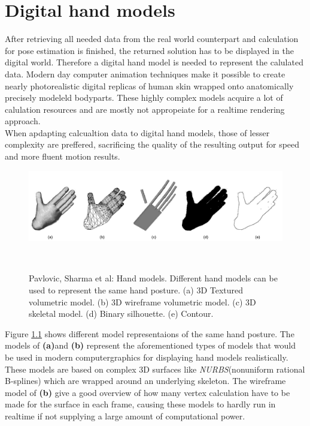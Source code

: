 \chapter{Digital hand models}
After retrieving all needed data from the real world counterpart and calculation for pose estimation is finished, the returned solution has to be displayed in the digital world. Therefore a digital hand model is needed to represent the calulated data. Modern day computer animation techniques make it possible to create nearly photorealistic digital replicas of human skin wrapped onto anatomically precisely modeleld bodyparts. These highly complex models acquire a lot of calulation resources and are mostly not appropeiate for a realtime rendering approach.\\
When apdapting calcualtion data to digital hand models, those of lesser complexity are preffered, sacrificing the quality of the resulting output for speed and more fluent motion results.
\begin{figure}[H]
\includegraphics[width=\textwidth]{images/Pavlovic-Sharmaetal.jpg}
\caption{Pavlovic, Sharma et al: Hand models. Different hand models can be used to represent the same hand posture. (a) 3D Textured volumetric model. (b) 3D wireframe volumetric model. (c) 3D skeletal model. (d) Binary silhouette. (e) Contour.}
~\cite[p.~682]{Pavlovic.1997}
\label{handmodels_detail_level}
\end{figure}
Figure \ref{handmodels_detail_level} shows different model representaions of the same hand posture. The models of \textbf{(a)}and \textbf{(b)} represent the aforementioned types of models that would be used in modern computergraphics for displaying hand models realistically.\\These models are based on complex 3D surfaces like \textit{NURBS}(nonuniform rational B-splines) which are wrapped around an underlying skeleton. The wireframe model of \textbf{(b)} give a good overview of how many vertex calculation have to be made for the surface in each frame, causing these models to hardly run in realtime if not supplying a large amount of computational power.\\
